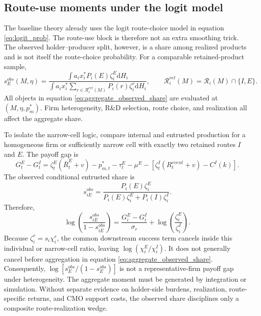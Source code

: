 \documentclass[12pt]{article}
\newcommand{\1}{\mathbf{1}}
\newcommand{\dd}{\mathrm{d}}
\newcommand{\calR}{\mathcal{R}}
\begin{document}
\subsection{Route-use moments under the logit model}

The baseline theory already uses the logit route-choice model in equation \eqref{eq:logit_prob}. The route-use block is therefore not an extra smoothing trick. The observed holder--producer split, however, is a share among realized products and is not itself the route-choice probability. For a comparable retained-product sample,
\begin{equation}
    s_E^{obs}(M,\eta)
    =
    \frac{\int a_i x_i^*P_i(E)\zeta_i^E\dd H_i}
    {\int a_i x_i^*\sum_{r\in\calR_i^{ret}(M)}P_i(r)\zeta_i^r\dd H_i},
    \qquad
    \calR_i^{ret}(M)=\calR_i(M)\cap\{I,E\}.
    \label{eq:aggregate_observed_share}
\end{equation}
All objects in equation \eqref{eq:aggregate_observed_share} are evaluated at $(M,\eta,p_m^*)$. Firm heterogeneity, R\&D selection, route choice, and realization all affect the aggregate share.

To isolate the narrow-cell logic, compare internal and entrusted production for a homogeneous firm or sufficiently narrow cell with exactly two retained routes $I$ and $E$. The payoff gap is
\begin{equation}
    G_t^E-G_t^I
    =
    \zeta_t^E(\bar R_t^E+v)
    -p_{m,t}^*
    -\tau_t^E-\mu^E
    -
    \left[\zeta_t^I(R_t^{event}+v)-C^I(k)\right].
    \label{eq:route_gap}
\end{equation}
The observed conditional entrusted share is
\begin{equation}
    s_{iE}^{obs}
    =
    \frac{P_i(E)\zeta_i^E}
    {P_i(E)\zeta_i^E+P_i(I)\zeta_i^I}.
    \label{eq:calib_logit_probability}
\end{equation}
Therefore,
\begin{equation}
    \log\left(\frac{s_{iE}^{obs}}{1-s_{iE}^{obs}}\right)
    =
    \frac{G_i^E-G_i^I}{\sigma_r}
    +\log\left(\frac{\zeta_i^E}{\zeta_i^I}\right).
    \label{eq:logodds}
\end{equation}
Because $\zeta_i^r=s_i\chi_i^r$, the common downstream success term cancels inside this individual or narrow-cell ratio, leaving $\log(\chi_i^E/\chi_i^I)$. It does not generally cancel before aggregation in equation \eqref{eq:aggregate_observed_share}. Consequently, $\log[s_E^{obs}/(1-s_E^{obs})]$ is not a representative-firm payoff gap under heterogeneity. The aggregate moment must be generated by integration or simulation. Without separate evidence on holder-side burdens, realization, route-specific returns, and CMO support costs, the observed share disciplines only a composite route-realization wedge.
\end{document}
